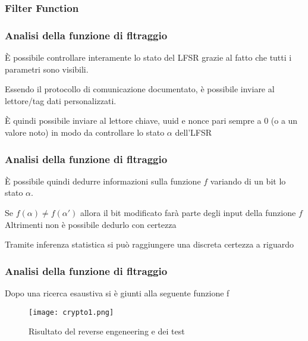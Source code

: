 \subsubsection{Filter Function}
\begin{frame}
    \frametitle{Analisi della funzione di fltraggio}\label{sec:filter-fn}
    È possibile controllare interamente lo stato del LFSR grazie al fatto che tutti i parametri sono visibili.\pause

    Essendo il protocollo di comunicazione documentato, è possibile inviare al lettore/tag dati personalizzati.\pause

    È quindi possibile inviare al lettore chiave, uuid e nonce pari sempre a 0 (o a un valore noto) in modo da controllare lo stato $\alpha$ dell'LFSR
\end{frame}
\begin{frame}
    \frametitle{Analisi della funzione di fltraggio}
    È possibile quindi dedurre informazioni sulla funzione $f$ variando di un bit lo stato $\alpha$.\pause

    Se $f(\alpha) \neq f(\alpha')$ allora il bit modificato farà parte degli input della funzione $f$
    Altrimenti non è possibile dedurlo con certezza\pause

    Tramite inferenza statistica si può raggiungere una discreta certezza a riguardo
\end{frame}
\begin{frame}
    \frametitle{Analisi della funzione di fltraggio}
    Dopo una ricerca esaustiva si è giunti alla seguente funzione f
    \begin{figure}
        \centering
        \texttt{[image: crypto1.png]}
        \caption{Risultato del reverse engeneering e dei test\cite{garcia2008dismantling}}
        \label{fig:crypto1}
    \end{figure}
\end{frame}